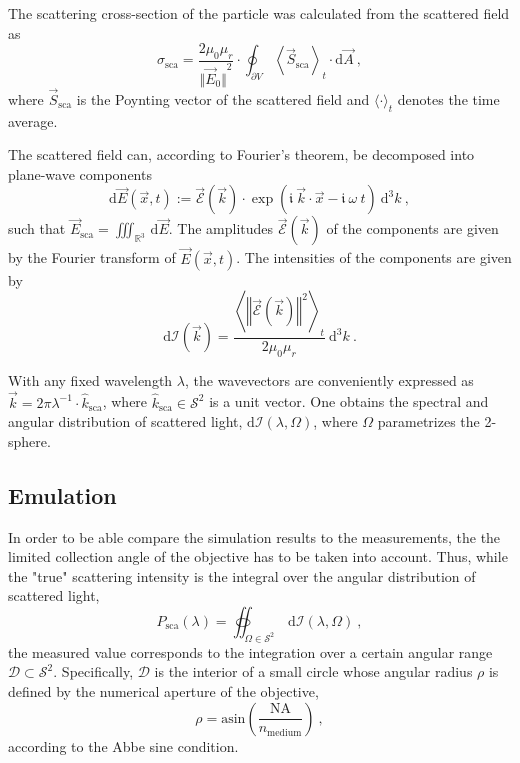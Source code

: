 \documentclass[10pt]{article}
\begin{document}
\begin{multicols}{2}
The scattering cross-section of the particle was calculated from the scattered field as 
$$
    \sigma_\mathrm{sca} = \frac{2 \mu_0 \mu_r}{ {\bigl\Vert \vec{E}_0 \bigr\Vert}^2 } \cdot \oint_{\partial V} {\left\langle \vec{S}_\mathrm{sca} \right\rangle}_t \cdot\mathrm{d}\vec{A} \ ,
$$
where $\vec{S}_\mathrm{sca}$ is the Poynting vector of the scattered field and $\langle\cdot\rangle_t$ denotes the time average. 

The scattered field can, according to Fourier's theorem, be decomposed into plane-wave components
$$
    \mathrm{d}\vec{E}(\vec{x},t) := \vec{\mathcal{E}}(\vec{k}) 
    \cdot 
    \exp{\!\left(\mathfrak{i}\ \vec{k}\cdot\vec{x} - \mathfrak{i}\ \omega\ t \right)}
    \ \mathrm{d}^3 k
    \ , 
$$
such that $ \vec{E}_\mathrm{sca} = \iiint_{\mathds{R}^3}\,\mathrm{d}\vec{E}$. 
The amplitudes $\vec{\mathcal{E}}(\vec{k})$ of the components are given by the Fourier transform of $\vec{E}(\vec{x},t)$. 
The intensities of the components are given by \cite{Griffiths-ED,MA} 
$$
    \mathrm{d}\mathcal{I}(\vec{k}) = \frac{ {\left\langle {\left\Vert \vec{\mathcal{E}}(\vec{k}) \right\Vert}^2 \right\rangle}_t }{ 2\mu_0 \mu_r } \ \mathrm{d}^3k
    \ .
$$

With any fixed wavelength $\lambda$, the wavevectors are conveniently expressed as $ \vec{k} = 2 \pi \lambda^{-1} \cdot \hat{k}_\mathrm{sca} $, where \mbox{$\hat{k}_\mathrm{sca} \in \mathcal{S}^2$} is a unit vector. 
One obtains the spectral and angular distribution of scattered light, $\mathrm{d}\mathcal{I}(\lambda, \Omega)$, where $\Omega$ parametrizes the 2-sphere. 







\subsection*{Emulation}

In order to be able compare the simulation results to the measurements, the the limited collection angle of the objective has to be taken into account. 
Thus, while the "true" scattering intensity is the integral over the angular distribution of scattered light, 
$$
    P_\mathrm{sca}(\lambda) = \oiint_{\Omega \in \mathcal{S}^2} \,\mathrm{d}\mathcal{I}(\lambda, \Omega) \ , %
$$
the measured value corresponds to the integration over a certain angular range $\mathcal{D} \subset \mathcal{S}^2$. 
Specifically, $\mathcal{D}$ is the interior of a small circle whose angular radius $\rho$ is defined by the numerical aperture of the objective, 
$$
    \rho = \mathrm{asin}\!\left( \frac{\mathrm{NA}}{n_\mathrm{medium}} \right) \ ,
$$
according to the Abbe sine condition. \cite{MONA-BFP-photonic-crystals,MONA-BFP-photonic-stop-bands}


\end{multicols}
\end{document}
